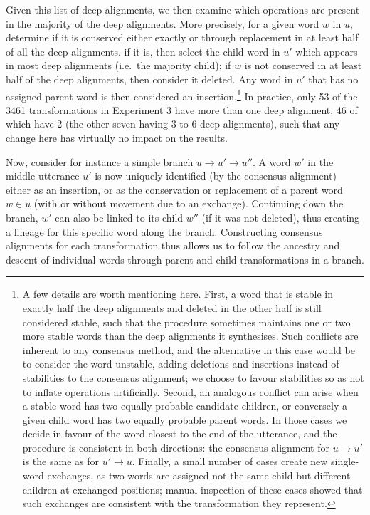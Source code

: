 Given this list of deep alignments, we then examine which operations are
present in the majority of the deep alignments. More precisely, for a
given word \(w\) in \(u\), determine if it is conserved either exactly
or through replacement in at least half of all the deep alignments. if
it is, then select the child word in \(u'\) which appears in most deep
alignments (i.e.~the majority child); if \(w\) is not conserved in at
least half of the deep alignments, then consider it deleted. Any word in
\(u'\) that has no assigned parent word is then considered an insertion.\footnote{
A few details are worth mentioning here. First, a word that is stable in
exactly half the deep alignments and deleted in the other half is still
considered stable, such that the procedure sometimes maintains one or
two more stable words than the deep alignments it synthesises. Such
conflicts are inherent to any consensus method, and the alternative in
this case would be to consider the word unstable, adding deletions and
insertions instead of stabilities to the consensus alignment; we choose
to favour stabilities so as not to inflate operations artificially.
Second, an analogous conflict can arise when a stable word has two
equally probable candidate children, or conversely a given child word
has two equally probable parent words. In those cases we decide in
favour of the word closest to the end of the utterance, and the
procedure is consistent in both directions: the consensus alignment for
\(u \rightarrow u'\) is the same as for \(u' \rightarrow u\). Finally, a
small number of cases create new single-word exchanges, as two words are
assigned not the same child but different children at exchanged
positions; manual inspection of these cases showed that such exchanges
are consistent with the transformation they represent.}
In practice, only 53 of the 3461 transformations in Experiment 3 have more than one deep
alignment, 46 of which have 2 (the other seven having 3 to 6 deep
alignments), such that any change here has virtually no impact on the
results.

Now, consider for instance a simple branch
\(u \rightarrow u' \rightarrow u''\). A word \(w'\) in the middle
utterance \(u'\) is now uniquely identified (by the consensus alignment)
either as an insertion, or as the conservation or replacement of a
parent word \(w \in u\) (with or without movement due to an exchange).
Continuing down the branch, \(w'\) can also be linked to its child
\(w''\) (if it was not deleted), thus creating a lineage for this
specific word along the branch. Constructing consensus alignments for
each transformation thus allows us to follow the ancestry and descent of
individual words through parent and child transformations in a branch.

